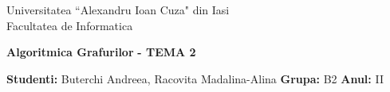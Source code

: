 \documentclass{article}
\begin{document}
\begin{titlepage}

\begin{center}
Universitatea ``Alexandru Ioan Cuza" din Iasi\\
Facultatea de Informatica\\
\end{center}

\vspace{80mm}
 
\begin{center}
\begin{Huge}
\textbf{Algoritmica Grafurilor}
\textbf{ - TEMA 2}
\end{Huge}
\end{center}
 
\vspace{60mm}
\begin{center}
\begin{Large}
\textbf{Studenti:} Buterchi Andreea, Racovita Madalina-Alina
\newline
\textbf{Grupa:} B2
\textbf{Anul:} II
\end{Large}
\end{center}
\vfill

\end{titlepage}
\end{document}
